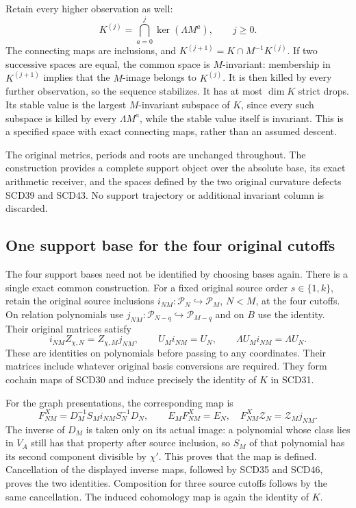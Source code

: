 \documentclass[11pt,a4paper]{article}
\theoremstyle{definition}\newtheorem{definition}[theorem]{Definition}
\newcommand{\Pp}{\mathcal P}\newcommand{\LL}{\mathcal L}
\begin{document}
Retain every higher observation as well:
\[
 K^{(j)}=\bigcap_{a=0}^{j}\ker(\Lambda M^a),\qquad j\ge0.
 \tag{SCD45}
\]
The connecting maps are inclusions, and
\(K^{(j+1)}=K\cap M^{-1}K^{(j)}\). If two successive spaces
are equal, the common space is \(M\)-invariant: membership in
\(K^{(j+1)}\) implies that the \(M\)-image belongs to \(K^{(j)}\).
It is then killed by every further observation, so the sequence
stabilizes. It has at most \(\dim K\) strict drops. Its stable
value is the largest \(M\)-invariant subspace of \(K\), since
every such subspace is killed by every \(\Lambda M^a\), while
the stable value itself is invariant. This is a specified space
with exact connecting maps, rather than an assumed descent.

The original metrics, periods and roots are unchanged throughout.
The construction provides a complete support object over the
absolute base, its exact arithmetic receiver, and the spaces
defined by the two original curvature defects SCD39 and SCD43.
No support trajectory or additional invariant column is discarded.

\subsection{One support base for the four original cutoffs}

The four support bases need not be identified by choosing bases again.
There is a single exact common construction. For a fixed original source
order \(s\in\{1,k\}\), retain the original source inclusions
\(i_{NM}:\Pp_N\hookrightarrow\Pp_M\), \(N<M\), at the four cutoffs.
On relation polynomials use \(j_{NM}:\Pp_{N-q}\hookrightarrow\Pp_{M-q}\)
and on \(B\) use the identity. Their original matrices satisfy
\[
 i_{NM}Z_{\chi,N}=Z_{\chi,M}j_{NM},\qquad
 U_Mi_{NM}=U_N,\qquad
 \Lambda U_Mi_{NM}=\Lambda U_N .
 \tag{SCD46}
\]
These are identities on polynomials before passing to any coordinates.
Their matrices include whatever original basis conversions are required.
They form cochain maps of SCD30 and induce precisely the identity of
\(K\) in SCD31.

For the graph presentations, the corresponding map is
\[
 F^X_{NM}=D_M^{-1}S_Mi_{NM}S_N^{-1}D_N,\qquad
 E_MF^X_{NM}=E_N,\quad
 F^X_{NM}\mathcal Z_N=\mathcal Z_Mj_{NM}.
 \tag{SCD47}
\]
The inverse of \(D_M\) is taken only on its actual image: a polynomial
whose class lies in \(V_A\) still has that property after source inclusion,
so \(S_M\) of that polynomial has its second component divisible by
\(\chi'\). This proves that the map is defined. Cancellation of the
displayed inverse maps, followed by SCD35 and SCD46, proves the two
identities. Composition for three source cutoffs follows by the same
cancellation. The induced cohomology map is again the identity of \(K\).
\end{document}
